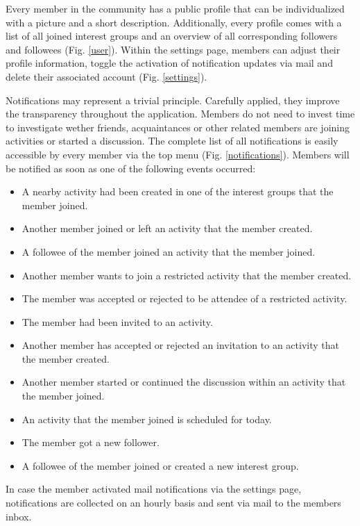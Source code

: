 \documentclass[12pt,numbers=noenddot,parskip,bibliography=totocnumbered,listof=totocnumbered,draft]{scrreprt}
\begin{document}
Every member in the community has a public profile that can be individualized with a picture and a short description. Additionally, every profile comes with a list of all joined interest groups and an overview of all corresponding followers and followees (Fig. \ref{user}). Within the settings page, members can adjust their profile information, toggle the activation of notification updates via mail and delete their associated account (Fig. \ref{settings}).

Notifications may represent a trivial principle. Carefully applied, they improve the transparency throughout the application. Members do not need to invest time to investigate wether friends, acquaintances or other related members are joining activities or started a discussion. The complete list of all notifications is easily accessible by every member via the top menu (Fig. \ref{notifications}). Members will be notified as soon as one of the following events occurred:

\begin{itemize}
	\item A nearby activity had been created in one of the interest groups that the member joined.
	\item Another member joined or left an activity that the member created.
	\item A followee of the member joined an activity that the member joined.
	\item Another member wants to join a restricted activity that the member created.
	\item The member was accepted or rejected to be attendee of a restricted activity.
	\item The member had been invited to an activity.
	\item Another member has accepted or rejected an invitation to an activity that the member created.
	\item Another member started or continued the discussion within an activity that the member joined.
	\item An activity that the member joined is scheduled for today.
	\item The member got a new follower.
	\item A followee of the member joined or created a new interest group.
\end{itemize}

In case the member activated mail notifications via the settings page, notifications are collected on an hourly basis and sent via mail to the members inbox.
\end{document}
